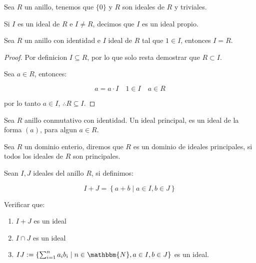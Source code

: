     \begin{observacion}
        Sea $R$ un anillo, tenemos que $\{ 0 \}$ y $R$ son ideales de $R$ y triviales.
    \end{observacion}

    \begin{definicion}
        Si $I$ es un ideal de $R$ e $I \ne R$, decimos que $I$ es un ideal propio.
    \end{definicion}

    \begin{observacion}
        Sea $R$ un anillo con identidad e $I$ ideal de $R$ tal que $1 \in I$, entonces $I = R$.
    \end{observacion}

    \begin{proof}
        Por definicion $I \subseteq R$, por lo que solo resta demostrar que $R \subset I$.

        Sea $a \in R$, entonces:

        \begin{equation*}
            a = a \cdot I \quad 1 \in I \quad a \in R
        \end{equation*}

        por lo tanto $a \in I$, $\therefore R \subseteq I$.
    \end{proof}

    \begin{definicion}
        Sea $R$ anillo conmutativo con identidad. Un ideal principal, es un ideal de la forma $(a)$, para algun $a \in R$.
    \end{definicion}

    \begin{definicion}
        Sea $R$ un dominio enterio, diremos que $R$ es un dominio de ideales principales, si todos los ideales de $R$ son principales.
    \end{definicion}

    \begin{observacion}
        Sean $I, J$ ideales del anillo $R$, si definimos:

        \begin{equation}
            I + J = \left\{ a + b \mid a \in I, b \in J \right\}
        \end{equation}

        Verificar que:
        
        \begin{enumerate}
            \item $I + J$ es un ideal
            \item $I \cap J$ es un ideal
            \item $IJ := \left\{ \sum_{i=1}^n a_i b_i \mid n \in \mathbbm{N}, a \in I, b \in J \right\}$ es un ideal.
        \end{enumerate}

    \end{observacion}

